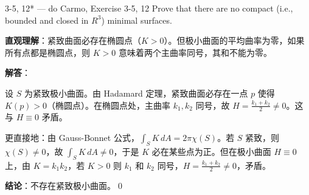 \begin{exercise}{3-5, 12* — do Carmo, Exercise 3-5, 12}
Prove that there are no compact (i.e., bounded and closed in $R^3$) minimal surfaces.
\end{exercise}
\begin{solution}
\textbf{直观理解}：紧致曲面必存在椭圆点（$K>0$）。但极小曲面的平均曲率为零，如果所有点都是椭圆点，则 $K>0$ 意味着两个主曲率同号，其和不能为零。

\textbf{解答}：

设 $S$ 为紧致极小曲面。由 Hadamard 定理，紧致曲面必存在一点 $p$ 使得 $K(p) > 0$（椭圆点）。在椭圆点处，主曲率 $k_1, k_2$ 同号，故 $H = \frac{k_1+k_2}{2} \neq 0$。这与 $H\equiv 0$ 矛盾。

更直接地：由 Gauss-Bonnet 公式，$\int_S K\,dA = 2\pi\chi(S)$。若 $S$ 紧致，则 $\chi(S) \neq 0$，故 $\int_S K\,dA \neq 0$，于是 $K$ 必在某些点为正。但在极小曲面 $H\equiv 0$ 上，由 $K = k_1k_2$，若 $K>0$ 则 $k_1$ 和 $k_2$ 同号，$H = \frac{k_1+k_2}{2} \neq 0$，矛盾。

\textbf{结论}：不存在紧致极小曲面。\qed
\end{solution}

